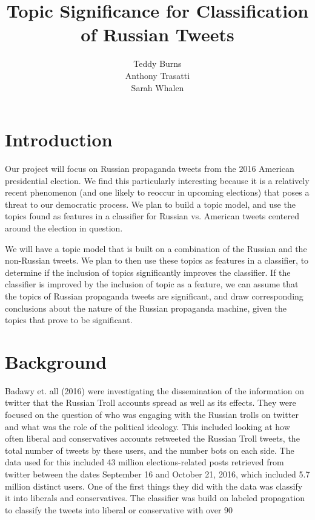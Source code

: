 \documentclass[11pt,a4paper]{article}
\title{Topic Significance for Classification of Russian Tweets}
\author{Teddy Burns  \\
  \And
  Anthony Trasatti \\
  \And
  Sarah Whalen \\
  }
\date{}
\begin{document}
\maketitle

\section{Introduction}

Our project will focus on Russian propaganda tweets from the 2016 American presidential election. We find this particularly interesting because it is a relatively recent phenomenon (and one likely to reoccur in upcoming elections) that poses a threat to our democratic process. We plan to build a topic model, and use the topics found as features in a classifier for Russian vs. American tweets centered around the election in question. 

We will have a topic model that is built on a combination of the Russian and the non-Russian tweets. We plan to then use these topics as features in a classifier, to determine if the inclusion of topics significantly improves the classifier. If the classifier is improved by the inclusion of topic as a feature, we can assume that the topics of Russian propaganda tweets are significant, and draw corresponding conclusions about the nature of the Russian propaganda machine, given the topics that prove to be significant. 


\section{Background}

Badawy et. all (2016) were investigating the dissemination of the information on twitter that the Russian Troll accounts spread as well as its effects. They were focused on the question of who was engaging with the Russian trolls on twitter and what was the role of the political ideology. This included looking at how often liberal and conservatives accounts retweeted the Russian Troll tweets, the total number of tweets by these users, and the number bots on each side. The data used for this included 43 million elections-related posts retrieved from twitter between the dates September 16 and October 21, 2016, which included 5.7 million distinct users. One of the first things they did with the data was classify it into liberals and conservatives. The classifier was build on labeled propagation to classify the tweets into liberal or conservative with over 90%
\end{document}
